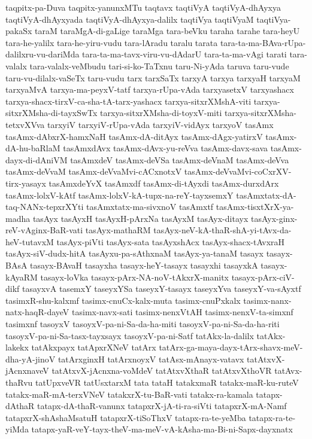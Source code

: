 {taqpitx-pa-Duva
taqpitx-yanunxMTu
taqtavx
taqtiVyA
taqtiVyA-dhAyxya
taqtiVyA-dhAyxyada
taqtiVyA-dhAyxya-dalilx
taqtiVya
taqtiVyaM
taqtiVya-pakaSx
taraM
taraMgA-di-gaLige
taraMga
tara-beVku
taraha
tarahe
tara-heyU
tara-he-yalilx
tara-he-yiru-vudu
tara-lAradu
taralu
tarata
tara-ta-ma-BAva-rUpa-dalilxru-vu-dariMda
tara-ta-ma-tavx-viru-vu-dAdarU
tara-ta-ma-vAgi
tarati
tara-valalx
tara-valalx-veMbudu
tari-si-ko-TaTxnu
taru-Ni-yAda
taruva
taru-vude
taru-vu-dilalx-vaSeTx
taru-vudu
tarx
tarxSaTx
tarxyA
tarxya
tarxyaH
tarxyaM
tarxyaMvA
tarxya-ma-peyxV-tatf
tarxya-rUpa-vAda
tarxyasetxV
tarxyashacx
tarxya-shacx-tirxV-ca-sha-tA-tarx-yashacx
tarxya-sitxrXMshA-viti
tarxya-sitxrXMsha-di-tayxSwTx
tarxya-sitxrXMsha-di-toyxV-miti
tarxya-sitxrXMsha-tetxvXVva
tarxyiV
tarxyiV-rUpa-vAda
tarxyiV-vidAyx
tarxyoV
tasAmx
tasAmx-dAbxrX-hamxNaH
tasAmx-dA-ditAyx
tasAmx-dAgx-yatirxV
tasAmx-dA-hu-baRlaM
tasAmxdAvx
tasAmx-dAvx-yu-reVva
tasAmx-davx-sava
tasAmx-dayx-di-dAniVM
tasAmxdeV
tasAmx-deVSa
tasAmx-deVnaM
tasAmx-deVva
tasAmx-deVvaM
tasAmx-deVvaMvi-cACxnotxV
tasAmx-deVvaMvi-coCxrXV-tirx-yasayx
tasAmxdeYvX
tasAmxdf
tasAmx-di-tAyxdi
tasAmx-durxdArx
tasAmx-lolxV-kAtf
tasAmx-lolxV-kA-tupx-na-reY-tayxsemxY
tasAmxtatx-dA-taq-NANx-tepxrXYti
tasAmxtatx-ma-sivxnoV
tasAmxtf
tasAmx-tisxtXrX-ya-madha
tasAyx
tasAyxH
tasAyxH-pArxNa
tasAyxM
tasAyx-ditayx
tasAyx-ginx-reV-vAginx-BaR-vati
tasAyx-mathaRM
tasAyx-neV-kA-thaR-shA-yi-tAvx-da-heV-tutavxM
tasAyx-piVti
tasAyx-sata
tasAyxshAcx
tasAyx-shacx-tAvxraH
tasAyx-siV-dudx-hitA
tasAyxu-pa-sAthxnaM
tasAyx-ya-tanaM
tasayx
tasayx-BAsA
tasayx-BAvaH
tasayxha
tasayx-heY-tasayx
tasayxhi
tasayxkA
tasayx-kAyaRM
tasayx-loVka
tasayx-pArx-NA-noV-tAkxrX-manitx
tasayx-pArx-ciV-dikf
tasayxvA
tasemxY
taseyxYSa
taseyxY-tasayx
taseyxYva
taseyxY-va-sAyxtf
tasimxR-shu-kalxmf
tasimx-cnuCx-kalx-muta
tasimx-cnuPxkalx
tasimx-nanx-natx-haqR-dayeV
tasimx-navx-sati
tasimx-nenxVtAH
tasimx-nenxV-ta-simxnf
tasimxnf
tasoyxV
tasoyxV-pa-ni-Sa-da-ha-miti
tasoyxV-pa-ni-Sa-da-ha-riti
tasoyxV-pa-ni-Sa-tasx-tayxsayx
tasoyxV-pa-ni-Satf
tatAkx-la-dalilx
tatAkx-lakekx
tatAkxpayx
tatApxrXNeV
tatArx
tatArx-ga-maya-dayx-tArx-shavx-meV-dha-yA-jinoV
tatArxginxH
tatArxnoyxV
tatAsx-mAnayx-vatavx
tatAtxvX-jAcnxnaveV
tatAtxvX-jAcnxna-voMdeV
tatAtxvXthaR
tatAtxvXthoVR
tatAvx-thaRvu
tatUpxveVR
tatUsxtarxM
tata
tataH
tatakxmaR
tatakx-maR-ku-ruteV
tatakx-maR-mA-terxVNeV
tatakxrX-tu-BaR-vati
tatakx-ra-kamala
tatapx-dAthaR
tatapx-dA-thaR-vanunx
tatapxrX-jA-ti-ra-siVti
tatapxrX-mA-Namf
tatapxrX-shAshaMsatuH
tatapxrX-tiSoThxV
tatapx-ra-te-yeMba
tatapx-ra-te-yiMda
tatapx-yaR-veY-tayx-theV-ma-meV-vA-kAsha-ma-Bi-ni-Sapx-dayxnatx
}
